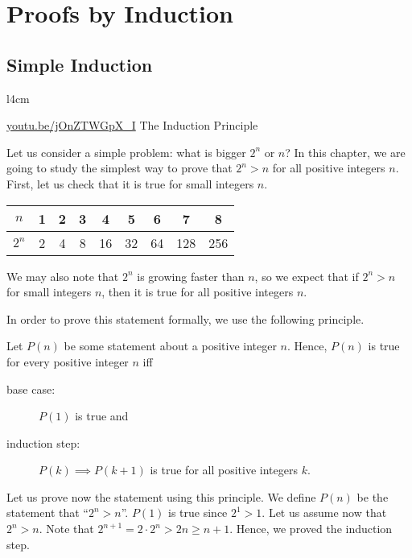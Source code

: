 \chapter{Proofs by Induction}
\section{Simple Induction}
\begin{wrapfigure}{l}{4cm}
  \begin{center}
    \vskip -0.5cm
    \vskip 0.25cm
    \href{https://youtu.be/jOnZTWGpX_I}{youtu.be/jOnZTWGpX\_I}
    {\footnotesize The Induction Principle}
  \end{center}
  \vskip -1.5cm
\end{wrapfigure}
Let us consider a simple problem: what is bigger $2^n$ or $n$? In this chapter,
we are going to study the simplest way to prove that $2^n > n$ for all positive
integers $n$. First, let us check that it is true for small integers $n$.
\begin{flushright}
  \begin{tabular}{c | c | c | c | c | c | c | c | c}
    $n$   & 1 & 2 & 3 & 4  & 5  & 6  & 7   & 8   \\
    \hline
    $2^n$ & 2 & 4 & 8 & 16 & 32 & 64 & 128 & 256
  \end{tabular}
\end{flushright}
We may also note that $2^n$ is growing faster than $n$, so we expect that if
$2^n > n$ for small integers $n$, then it is true for all positive integers $n$.

In order to prove this statement formally, we use the following principle.
\begin{principle}
  Let $P(n)$ be some statement about a positive integer $n$.
  Hence, $P(n)$ is true for every positive integer $n$ iff
  \begin{description}
    \item[base case:] $P(1)$ is true and
    \item[induction step:] $P(k) \implies P(k + 1)$ is true for all positive
      integers $k$.
  \end{description}
\end{principle}

Let us prove now the statement using this principle.
We define $P(n)$ be the statement that ``$2^n > n$''.
$P(1)$ is true since $2^1 > 1$. Let us assume now that $2^n > n$. Note that
$2^{n + 1} = 2 \cdot 2^n > 2n \ge n + 1$. Hence, we proved the induction step.

